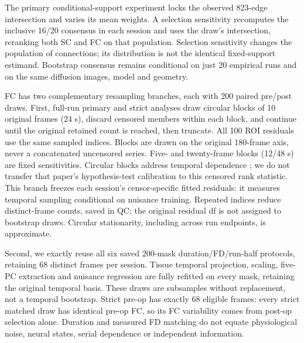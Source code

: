 \documentclass[11pt,a4paper]{article}
\begin{document}
The primary conditional-support experiment locks the observed 823-edge intersection and varies its mean weights. A selection sensitivity recomputes the inclusive 16/20 consensus in each session and uses the draw's intersection, reranking both SC and FC on that population. Selection sensitivity changes the population of connections; its distribution is not the identical fixed-support estimand. Bootstrap consensus remains conditional on just 20 empirical runs and on the same diffusion images, model and geometry.

FC has two complementary resampling branches, each with 200 paired pre/post draws. First, full-run primary and strict analyses draw circular blocks of 10 original frames (24 s), discard censored members within each block, and continue until the original retained count is reached, then truncate. All 100 ROI residuals use the same sampled indices. Blocks are drawn on the original 180-frame axis, never a concatenated uncensored series. Five- and twenty-frame blocks (12/48 s) are fixed sensitivities. Circular blocks address temporal dependence \citep{bellec2008}; we do not transfer that paper's hypothesis-test calibration to this censored rank statistic. This branch freezes each session's censor-specific fitted residuals: it measures temporal sampling conditional on nuisance training. Repeated indices reduce distinct-frame counts, saved in QC; the original residual df is not assigned to bootstrap draws. Circular stationarity, including across run endpoints, is approximate.

Second, we exactly reuse all six saved 200-mask duration/FD/run-half protocols, retaining 68 distinct frames per session. Tissue temporal projection, scaling, five-PC extraction and nuisance regression are fully refitted on every mask, retaining the original temporal basis. These draws are subsamples without replacement, not a temporal bootstrap. Strict pre-op has exactly 68 eligible frames: every strict matched draw has identical pre-op FC, so its FC variability comes from post-op selection alone. Duration and measured FD matching do not equate physiological noise, neural states, serial dependence or independent information.
\end{document}
